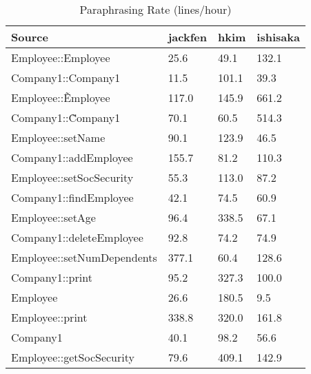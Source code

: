 \begin{table}[hb]
\begin{center}
\begin{tabular}{|l|l|l|l|}
\hline
Source & jackfen & hkim & ishisaka\\
\hline
Employee::Employee & 25.6 & 49.1 & 132.1\\
Company1::Company1 & 11.5 & 101.1 & 39.3\\
Employee::\~Employee & 117.0 & 145.9 & 661.2\\
Company1::\~Company1 & 70.1 & 60.5 & 514.3\\
Employee::setName & 90.1 & 123.9 & 46.5\\
Company1::addEmployee & 155.7 & 81.2 & 110.3\\
Employee::setSocSecurity & 55.3 & 113.0 & 87.2\\
Company1::findEmployee & 42.1 & 74.5 & 60.9\\
Employee::setAge & 96.4 & 338.5 & 67.1\\
Company1::deleteEmployee & 92.8 & 74.2 & 74.9\\
Employee::setNumDependents & 377.1 & 60.4 & 128.6\\
Company1::print & 95.2 & 327.3 & 100.0\\
Employee & 26.6 & 180.5 & 9.5\\
Employee::print & 338.8 & 320.0 & 161.8\\
Company1 & 40.1 & 98.2 & 56.6\\
Employee::getSocSecurity & 79.6 & 409.1 & 142.9\\
\hline
\end{tabular}
\end{center}
\caption{Paraphrasing Rate (lines/hour)}
\end{table}

